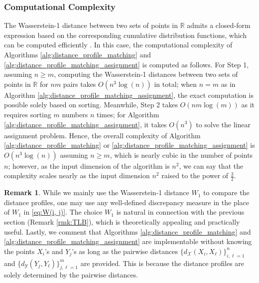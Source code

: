 \documentclass[11pt,letterpaper]{article}
\theoremstyle{definition}
\newtheorem{remark}{Remark}
\numberwithin{equation}{section}
\newcommand{\cX}{\mathcal{X}}
\newcommand{\cY}{\mathcal{Y}}
\newcommand{\R}{\mathbb{R}}
\begin{document}
\subsubsection{Computational Complexity}
The Wasserstein-1 distance between two sets of points in $\R$ admits a closed-form expression based on the corresponding cumulative distribution functions, which can be computed efficiently \citep{peyre2019computational}. In this case, the computational complexity of Algorithms \ref{alg:distance_profile_matching} and \ref{alg:distance_profile_matching_assignment} is computed as follows. For Step 1, assuming $n \ge m$, computing the Wasserstein-1 distances between two sets of points in $\R$ for $n m$ pairs takes $O(n^3 \log(n))$ in total; when $n = m$ as in Algorithm \ref{alg:distance_profile_matching_assignment}, the exact computation is possible solely based on sorting. Meanwhile, Step 2 takes $O(n m \log(m))$ as it requires sorting $m$ numbers $n$ times; for Algorithm \ref{alg:distance_profile_matching_assignment}, it takes $O(n^3)$ to solve the linear assignment problem. Hence, the overall complexity of Algorithm \ref{alg:distance_profile_matching} or \ref{alg:distance_profile_matching_assignment} is $O(n^3 \log(n))$ assuming $n \ge m$, which is nearly cubic in the number of points $n$; however, as the input dimension of the algorithm is $n^2$, we can say that the complexity scales nearly as the input dimension $n^2$ raised to the power of $\frac{3}{2}$. 

\begin{remark}
    While we mainly use the Wasserstein-1 distance $W_1$ to compare the distance profiles, one may use any well-defined discrepancy measure in the place of $W_1$ in \eqref{eq:W(i, j)}. The choice $W_1$ is natural in connection with the previous section (Remark \ref{rmk:TLB}), which is theoretically appealing and practically useful. Lastly, we comment that Algorithms \ref{alg:distance_profile_matching} and \ref{alg:distance_profile_matching_assignment} are implementable without knowing the points $X_i$'s and $Y_j$'s as long as the pairwise distances $\{d_\cX(X_i, X_\ell)\}_{i, \ell = 1}^{n}$ and $\{d_\cY(Y_j, Y_\ell)\}_{j, \ell = 1}^{m}$ are provided. This is because the distance profiles are solely determined by the pairwise distances.
\end{remark}
\end{document}
